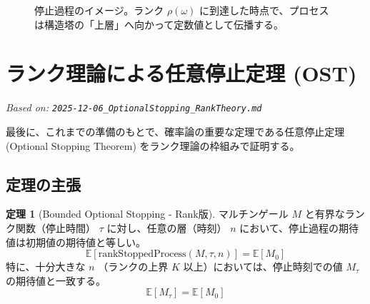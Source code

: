 \documentclass[a4paper,11pt]{ltjsarticle}
\theoremstyle{definition}
\newtheorem{theorem}[definition]{定理}
\newcommand{\Expect}{\mathbb{E}}
\newcommand{\Tau}{\tau}
\newcommand{\Rank}{\rho}
\begin{document}
\begin{figure}[h]
\centering
{}
\caption{停止過程のイメージ。ランク $\Rank(\omega)$ に到達した時点で、プロセスは構造塔の「上層」へ向かって定数値として伝播する。}
\end{figure}

\section{ランク理論による任意停止定理 (OST)}
\label{sec:ost}
\textit{Based on: \texttt{2025-12-06\_OptionalStopping\_RankTheory.md}}

最後に、これまでの準備のもとで、確率論の重要な定理である任意停止定理 (Optional Stopping Theorem) をランク理論の枠組みで証明する。

\subsection{定理の主張}

\begin{theorem}[Bounded Optional Stopping - Rank版]
マルチンゲール $M$ と有界なランク関数（停止時間） $\Tau$ に対し、任意の層（時刻） $n$ において、停止過程の期待値は初期値の期待値と等しい。
\[
    \Expect[\text{rankStoppedProcess}(M, \Tau, n)] = \Expect[M_0]
\]
特に、十分大きな $n$ （ランクの上界 $K$ 以上）においては、停止時刻での値 $M_\Tau$ の期待値と一致する。
\[
    \Expect[M_\Tau] = \Expect[M_0]
\]
\end{theorem}
\end{document}

